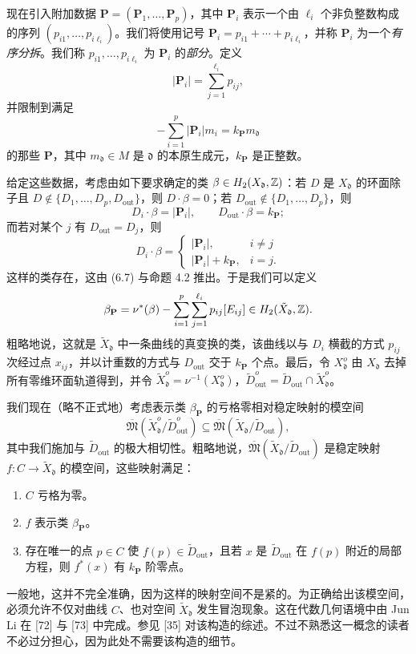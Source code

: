 现在引入附加数据 $\mathbf{P}=(\mathbf{P}_1,\dots,\mathbf{P}_p)$，其中 $\mathbf{P}_i$ 表示一个由 $\ell_i$ 个非负整数构成的序列 $(p_{i1},\dots,p_{i\ell_i})$。我们将使用记号 $\mathbf{P}_i=p_{i1}+\cdots+p_{i\ell_i}$，并称 $\mathbf{P}_i$ 为一个\emph{有序分拆}。我们称 $p_{i1},\dots,p_{i\ell_i}$ 为 $\mathbf{P}_i$ 的\emph{部分}。定义
\[
|\mathbf{P}_i|=\sum_{j=1}^{\ell_i}p_{ij},
\]
并限制到满足
\begin{equation}
-\sum_{i=1}^p|\mathbf{P}_i|m_i=k_{\mathbf{P}}m_{\mathfrak{d}}
\tag{6.7}
\end{equation}
的那些 $\mathbf{P}$，其中 $m_{\mathfrak{d}}\in M$ 是 $\mathfrak{d}$ 的本原生成元，$k_{\mathbf{P}}$ 是正整数。

给定这些数据，考虑由如下要求确定的类 $\beta\in H_2(X_{\mathfrak{d}},\mathbb{Z})$：若 $D$ 是 $X_{\mathfrak{d}}$ 的环面除子且 $D\notin\{D_1,\dots,D_p,D_{\mathrm{out}}\}$，则 $D\cdot\beta=0$；若 $D_{\mathrm{out}}\notin\{D_1,\dots,D_p\}$，则
\[
D_i\cdot\beta=|\mathbf{P}_i|,\qquad D_{\mathrm{out}}\cdot\beta=k_{\mathbf{P}};
\]
而若对某个 $j$ 有 $D_{\mathrm{out}}=D_j$，则
\[
D_i\cdot\beta=\begin{cases}|\mathbf{P}_i|,&i\ne j\\ |\mathbf{P}_i|+k_{\mathbf{P}},&i=j.\end{cases}
\]
这样的类存在，这由 (6.7) 与命题 4.2 推出。于是我们可以定义
\[
\beta_{\mathbf{P}}=\nu^*(\beta)-\sum_{i=1}^p\sum_{j=1}^{\ell_i}p_{ij}[E_{ij}]\in H_2(\tilde X_{\mathfrak{d}},\mathbb{Z}).
\]
粗略地说，这就是 $\tilde X_{\mathfrak{d}}$ 中一条曲线的真变换的类，该曲线以与 $D_i$ 横截的方式 $p_{ij}$ 次经过点 $x_{ij}$，并以计重数的方式与 $D_{\mathrm{out}}$ 交于 $k_{\mathbf{P}}$ 个点。最后，令 $X_{\mathfrak{d}}^o$ 由 $X_{\mathfrak{d}}$ 去掉所有零维环面轨道得到，并令 $\tilde X_{\mathfrak{d}}^o=\nu^{-1}(X_{\mathfrak{d}}^o)$，$\tilde D_{\mathrm{out}}^o=\tilde D_{\mathrm{out}}\cap\tilde X_{\mathfrak{d}}^o$。

我们现在（略不正式地）考虑表示类 $\beta_{\mathbf{P}}$ 的亏格零相对稳定映射的模空间
\[
\overline{\mathfrak{M}}(\tilde X_{\mathfrak{d}}^o/\tilde D_{\mathrm{out}}^o)\subseteq\overline{\mathfrak{M}}(\tilde X_{\mathfrak{d}}/\tilde D_{\mathrm{out}}),
\]
其中我们施加与 $\tilde D_{\mathrm{out}}$ 的极大相切性。粗略地说，$\overline{\mathfrak{M}}(\tilde X_{\mathfrak{d}}/\tilde D_{\mathrm{out}})$ 是稳定映射 $f:C\to\tilde X_{\mathfrak{d}}$ 的模空间，这些映射满足：
\begin{enumerate}[label=(\arabic*)]
\item $C$ 亏格为零。
\item $f$ 表示类 $\beta_{\mathbf{P}}$。
\item 存在唯一的点 $p\in C$ 使 $f(p)\in\tilde D_{\mathrm{out}}$，且若 $x$ 是 $\tilde D_{\mathrm{out}}$ 在 $f(p)$ 附近的局部方程，则 $f^*(x)$ 有 $k_{\mathbf{P}}$ 阶零点。
\end{enumerate}
一般地，这并不完全准确，因为这样的映射空间不是紧的。为正确给出该模空间，必须允许不仅对曲线 $C$、也对空间 $\tilde X_{\mathfrak{d}}$ 发生冒泡现象。这在代数几何语境中由 Jun Li 在 [72] 与 [73] 中完成。参见 [35] 对该构造的综述。不过不熟悉这一概念的读者不必过分担心，因为此处不需要该构造的细节。


